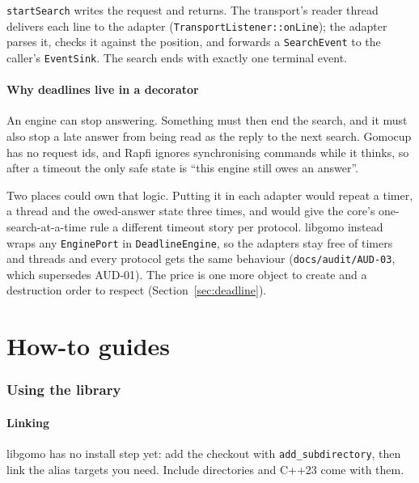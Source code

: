 \documentclass[11pt,a4paper]{article}
\newcommand{\code}[1]{\texttt{#1}}
\newcommand{\file}[1]{\texttt{#1}}
\begin{document}
\noindent \code{startSearch} writes the request and returns. The transport's reader thread delivers
each line to the adapter (\code{TransportListener::onLine}); the adapter parses it, checks it against
the position, and forwards a \code{SearchEvent} to the caller's \code{EventSink}. The search ends with
exactly one terminal event.


\subsection{Why deadlines live in a decorator}\label{sec:why-deadline}

An engine can stop answering. Something must then end the search, and it must also stop a late
answer from being read as the reply to the next search. Gomocup has no request ids, and Rapfi
ignores synchronising commands while it thinks, so after a timeout the only safe state is
``this engine still owes an answer''.

Two places could own that logic. Putting it in each adapter would repeat a timer, a thread and the
owed-answer state three times, and would give the core's one-search-at-a-time rule a different
timeout story per protocol. libgomo instead wraps any \code{EnginePort} in \code{DeadlineEngine},
so the adapters stay free of timers and threads and every protocol gets the same behaviour
(\file{docs/audit/AUD-03}, which supersedes AUD-01). The price is one more object to create and a
destruction order to respect (Section~\ref{sec:deadline}).

\part{How-to guides}

\section{Using the library}

\subsection{Linking}

libgomo has no install step yet: add the checkout with \code{add\_subdirectory}, then link the
alias targets you need. Include directories and C++23 come with them.
\end{document}
